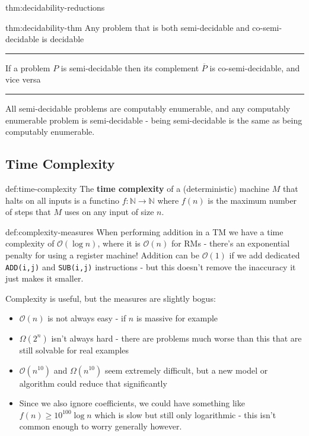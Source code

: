 \documentclass[landscape, 8pt]{extarticle}
\begin{document}
\begin{multicols}{3}
\begin{thm}{thm:decidability-reductions}{}
\end{thm}

\begin{thm}{thm:decidability-thm}{}
Any problem that is both semi-decidable and co-semi-decidable is decidable
\newline
\noindent\rule{\textwidth}{0.2pt}
If a problem $P$ is semi-decidable then its complement $\overline{P}$ is co-semi-decidable, and vice versa
\newline
\noindent\rule{\textwidth}{0.2pt}
All semi-decidable problems are computably enumerable, and any computably enumerable problem is semi-decidable - being semi-decidable is the same as being computably enumerable.
\end{thm}


\subsection*{Time Complexity}
\begin{dfn}{def:time-complexity}{}
The \textbf{time complexity} of a (deterministic) machine $M$ that halts on all inputs is a functino $f : \mathbb{N} \to \mathbb{N}$ where $f(n)$ is the maximum number of steps that $M$ uses on any input of size $n$.
\end{dfn}


\begin{dfn}{def:complexity-measures}{}
When performing addition in a TM we have a time complexity of $\mathcal{O}(\log n)$, where it is $\mathcal{O}(n)$ for RMs - there's an exponential penalty for using a register machine!
\newline
Addition can be $\mathcal{O}(1)$ if we add dedicated \texttt{ADD(i,j)} and \texttt{SUB(i,j)} instructions - but this doesn't remove the inaccuracy it just makes it smaller.

Complexity is useful, but the measures are slightly bogus:
\begin{itemize}
    \item $\mathcal{O}(n)$ is not always easy - if $n$ is massive for example
    \item $\Omega(2^n)$ isn't always hard - there are problems much worse than this that are still solvable for real examples
    \item $\mathcal{O}(n^{10})$ and $\Omega(n^{10})$ seem extremely difficult, but a new model or algorithm could reduce that significantly
    \item Since we also ignore coefficients, we could have something like $f(n) \geq 10^{100} \log n$ which is slow but still only logarithmic - this isn't common enough to worry generally however.
\end{itemize}
\end{dfn}



\end{multicols}
\end{document}
